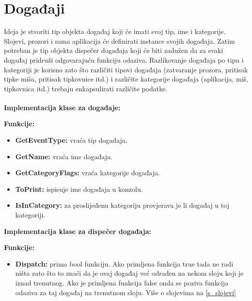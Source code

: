 \documentclass{mathos}
\begin{document}
\section{Događaji}
Ideja je stvoriti tip objekta događaj koji će imati svoj tip, ime i kategorije. Slojevi, prozori i sama aplikacija će definirati instance svojih događaja. Zatim potreban je tip
objekta dispečer događaja koji će biti zadužen da za svaki događaj pridruži odgovarajuću funkciju odaziva. Razlikovanje događaja po tipu i kategoriji je korisno zato što
različiti tipovi događaja (zatvaranje prozora, pritisak tipke miša, pritisak tipkovnice itd.) i različite kategorije događaja (aplikacija, miš, tipkovnica itd.) trebaju
enkapsulirati različite podatke.
\\ \\
\textbf{Implementacija klase za događaje:}

\textbf{Funkcije: }
\begin{itemize}
    \item \textbf{GetEventType:} vraća tip događaja.
    \item \textbf{GetName:} vraća ime događaja.
    \item \textbf{GetCategoryFlags:} vraća kategorije događaja.
    \item \textbf{ToPrint:} ispisuje ime događaja u konzolu.
    \item \textbf{IsInCategory:} za proslijeđenu kategoriju provjerava je li događaj u toj kategoriji.
\end{itemize}
\textbf{Implementacija klase za dispečer događaja:}

\textbf{Funkcije: }
\begin{itemize}
    \item \textbf{Dispatch:} prima bool funkciju. Ako primljena funkcija true tada ne radi ništa zato što to znači da je ovaj događaj već odrađen na nekom sloju koji je iznad
          trenutnog. Ako je primljena funkcija false onda se poziva funkcija odaziva za taj događaj na trenutnom sloju. Više o slojevima na  \ref{s_slojevi}
\end{itemize}
\end{document}
